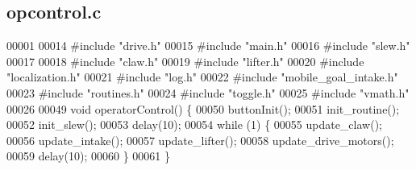 \subsection{opcontrol.\+c}
\label{a00134_source}

\begin{DoxyCode}
00001 
00014 \textcolor{preprocessor}{#include "drive.h"}
00015 \textcolor{preprocessor}{#include "main.h"}
00016 \textcolor{preprocessor}{#include "slew.h"}
00017 
00018 \textcolor{preprocessor}{#include "claw.h"}
00019 \textcolor{preprocessor}{#include "lifter.h"}
00020 \textcolor{preprocessor}{#include "localization.h"}
00021 \textcolor{preprocessor}{#include "log.h"}
00022 \textcolor{preprocessor}{#include "mobile_goal_intake.h"}
00023 \textcolor{preprocessor}{#include "routines.h"}
00024 \textcolor{preprocessor}{#include "toggle.h"}
00025 \textcolor{preprocessor}{#include "vmath.h"}
00026 
00049 \textcolor{keywordtype}{void} operatorControl() \{
00050   buttonInit();
00051   init_routine();
00052   init_slew();
00053   delay(10);
00054   \textcolor{keywordflow}{while} (1) \{
00055     update_claw();
00056     update_intake();
00057     update_lifter();
00058     update_drive_motors();
00059     delay(10);
00060   \}
00061 \}
\end{DoxyCode}
